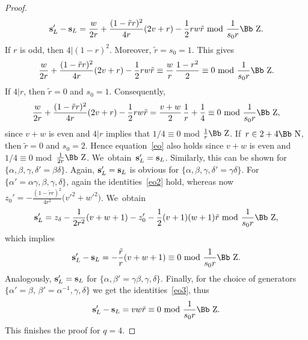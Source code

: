 \documentclass[10pt,a4paper]{amsart}
\newcommand\NN{{\mbox{\Bb N}}}
\newcommand\ZZ{{\mbox{\Bb Z}}}
\newcommand\bs{\textbf{{\rm \textbf{s}}}}
\numberwithin{equation}{section}
\begin{document}
\begin{proof}
\begin{gather*}
 \bs_L'-\bs_L=\frac w{2r}+\frac{(1-\tilde r r)^2}{4r}(2v+r)-\frac12 rw\tilde r\ {\rm mod}\ \frac{1}{s_0r}\ZZ.
 \end{gather*}
If $r$ is odd, then $4|(1-r)^2$. Moreover, $\tilde r=s_0=1$. This gives
\begin{gather*}
\frac w{2r}+\frac{(1-\tilde r r)^2}{4r}(2v+r)-\frac12 rw\tilde r \equiv \frac wr\, \frac{1-r^2}2 \equiv 0\ {\rm mod}\ \frac{1}{s_0r}\ZZ.
\end{gather*}
If $4|r$, then $\tilde r=0$ and $s_0=1$. Consequently,
\begin{gather}\label{eo}
\frac w{2r}+\frac{(1-\tilde r r)^2}{4r}(2v+r)-\frac12 rw\tilde r = \frac {v+w}2\, \frac 1r +\frac14 \equiv 0\ {\rm mod}\ \frac{1}{s_0r}\ZZ,
\end{gather}
since $v+w$ is even and $4|r$ implies that $1/4\equiv 0$ mod $\frac1r \ZZ$. If~$r\in 2+4\NN$, then $\tilde r=0$ and $s_0=2$. Hence equation~\eqref{eo} also holds since $v+w$ is even and $1/4\equiv 0$ mod~$\frac 1{2r}\ZZ$. We~obtain~$\bs_L'=\bs_L$. Similarly, this can be shown for $\{\alpha,\beta,\gamma,\delta'=\beta\delta\}$. Again, $\bs_L'=\bs_L$ is obvious for $\{\alpha,\beta,\gamma,\mbox{$\delta'=\gamma\delta$}\}$. For $\{\alpha'=\alpha\gamma,\beta,\gamma,\delta\}$, again the identities~\eqref{eo2} hold, whereas now $z_0'=-\frac{(1-\tilde r r)^2}{4r^2}\big(v'^2+w'^2\big)$. We~obtain
\begin{gather*}
\bs_L'=z_\delta-\frac1{2r^2}(v+w+1) -z_0'-\frac12(v+1)(w+1)\tilde r\ {\rm mod}\ \frac{1}{s_0r}\ZZ,
\end{gather*}
which implies
\begin{gather*}
\bs_L'-\bs_L=-\frac{\tilde r}r(v+w+1) \equiv 0\ {\rm mod}\ \frac{1}{s_0r}\ZZ.
\end{gather*}
Analogously, $\bs_L'=\bs_L$ for $\{\alpha,\beta'=\gamma\beta,\gamma,\delta\}$.
Finally, for the choice of generators $\{\alpha'=\beta,\, \beta'=\alpha^{-1},\gamma,\delta\}$ we get the identities~\eqref{eo3}, thus
\begin{gather*}
\bs_L'-\bs_L=vw\tilde r \equiv 0\ {\rm mod}\ \frac{1}{s_0r}\ZZ.
\end{gather*}
This finishes the proof for $q=4$.
\end{proof}
\end{document}
